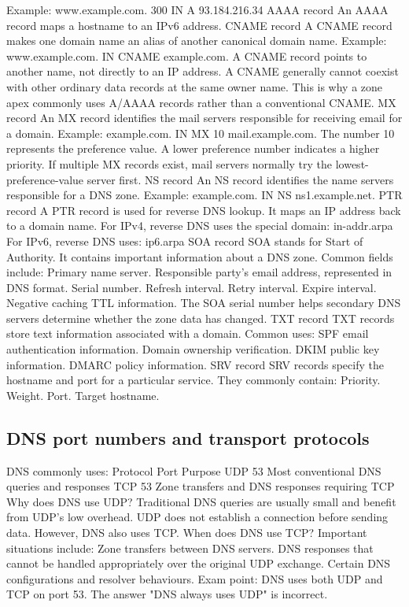 Example:
www.example.com. 300 IN A 93.184.216.34
AAAA record
An AAAA record maps a hostname to an IPv6 address.
CNAME record
A CNAME record makes one domain name an alias of another canonical domain name.
Example:
www.example.com. IN CNAME example.com.
A CNAME record points to another name, not directly to an IP address.
A CNAME generally cannot coexist with other ordinary data records at the same owner name. This is why a zone apex commonly uses A/AAAA records rather than a conventional CNAME.
MX record
An MX record identifies the mail servers responsible for receiving email for a domain.
Example:
example.com. IN MX 10 mail.example.com.
The number 10 represents the preference value.
A lower preference number indicates a higher priority.
If multiple MX records exist, mail servers normally try the lowest-preference-value server first.
NS record
An NS record identifies the name servers responsible for a DNS zone.
Example:
example.com. IN NS ns1.example.net.
PTR record
A PTR record is used for reverse DNS lookup.
It maps an IP address back to a domain name.
For IPv4, reverse DNS uses the special domain:
in-addr.arpa
For IPv6, reverse DNS uses:
ip6.arpa
SOA record
SOA stands for Start of Authority.
It contains important information about a DNS zone.
Common fields include:
Primary name server.
Responsible party's email address, represented in DNS format.
Serial number.
Refresh interval.
Retry interval.
Expire interval.
Negative caching TTL information.
The SOA serial number helps secondary DNS servers determine whether the zone data has changed.
TXT record
TXT records store text information associated with a domain.
Common uses:
SPF email authentication information.
Domain ownership verification.
DKIM public key information.
DMARC policy information.
SRV record
SRV records specify the hostname and port for a particular service.
They commonly contain:
Priority.
Weight.
Port.
Target hostname.
\subsection{DNS port numbers and transport protocols}
DNS commonly uses:
Protocol
Port
Purpose
UDP
53
Most conventional DNS queries and responses
TCP
53
Zone transfers and DNS responses requiring TCP
Why does DNS use UDP?
Traditional DNS queries are usually small and benefit from UDP's low overhead.
UDP does not establish a connection before sending data.
However, DNS also uses TCP.
When does DNS use TCP?
Important situations include:
Zone transfers between DNS servers.
DNS responses that cannot be handled appropriately over the original UDP exchange.
Certain DNS configurations and resolver behaviours.
Exam point: DNS uses both UDP and TCP on port 53. The answer "DNS always uses UDP" is incorrect.
